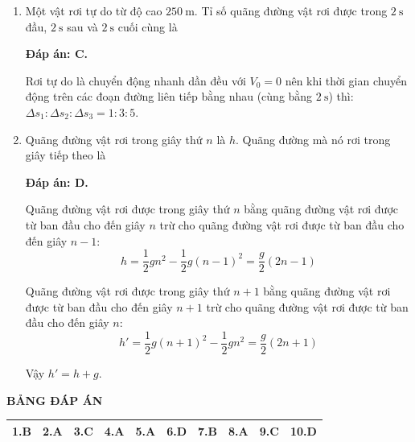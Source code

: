 \begin{enumerate}[label=\bfseries Câu \arabic*:]
	
	\item {}
	
	
	{Một vật rơi tự do từ độ cao $250\ \text{m}$. Tỉ số quãng đường vật rơi được trong $2\ \text{s}$ đầu, $2\ \text{s}$ sau và $2\ \text{s}$ cuối cùng là
	}
	\hideall
	{	\textbf{Đáp án: C.}
		
		Rơi tự do là chuyển động nhanh dần đều với $V_0=0$  nên khi thời gian chuyển động trên các đoạn đường liên tiếp bằng nhau (cùng bằng $2\ \text{s}$) thì: $\Delta s_1:\Delta s_2:\Delta s_3=1:3:5$.
	}
	\item {}
	
	
	{Quãng đường vật rơi trong giây thứ $n$ là $h$. Quãng đường mà nó rơi trong giây tiếp theo là
		
		
	}
	\hideall
	{	\textbf{Đáp án: D.}
		
		Quãng đường vật rơi được trong giây thứ $n$ bằng quãng đường vật rơi được từ ban đầu cho đến giây $n$ trừ cho quãng đường vật rơi được từ ban đầu cho đến giây $n-1$: $$h=\dfrac{1}{2}gn^2-\dfrac{1}{2}g(n-1)^2=\dfrac{g}{2}(2n-1)$$
		
		Quãng đường vật rơi được trong giây thứ $n+1$ bằng quãng đường vật rơi được từ ban đầu cho đến giây $n+1$ trừ cho quãng đường vật rơi được từ ban đầu cho đến giây $n$:
		$$h'=\dfrac{1}{2}g(n+1)^2-\dfrac{1}{2}gn^2 = \dfrac{g}{2}(2n+1)$$
		
		Vậy $h'=h+g$.
	}
\end{enumerate}


\hideall
{
	\begin{center}
		\textbf{BẢNG ĐÁP ÁN}
	\end{center}
	\begin{center}
		\begin{tabular}{|m{2.8em}|m{2.8em}|m{2.8em}|m{2.8em}|m{2.8em}|m{2.8em}|m{2.8em}|m{2.8em}|m{2.8em}|m{2.8em}|}
			\hline
			1.B  & 2.A  & 3.C  & 4.A  & 5.A  & 6.D  & 7.B  & 8.A  & 9.C  & 10.D  \\
			\hline
			
		\end{tabular}
	\end{center}
}
